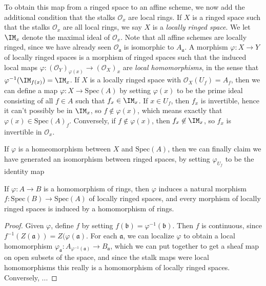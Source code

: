 To obtain this map from a ringed space to an affine scheme, we now add the additional condition that the stalks $\mathcal{O}_x$ are local rings. If $X$ is a ringed space such that the stalks $\mathcal{O}_x$ are all local rings, we say $X$ is a {\it locally ringed space}. We let $\IM_x$ denote the maximal ideal of $\mathcal{O}_x$. Note that all affine schemes are locally ringed, since we have already seen $\mathcal{O}_{\mathfrak{a}}$ is isomorphic to $A_{\mathfrak{a}}$. A morphism $\varphi: X \to Y$ of locally ringed spaces is a morphism of ringed spaces such that the induced local maps $\varphi: (\mathcal{O}_Y)_{\varphi(x)} \to (\mathcal{O}_X)_x$ are {\it local homomorphisms}, in the sense that $\varphi^{-1}(\IM_{f(x)}) = \IM_x$. If $X$ is a locally ringed space with $\mathcal{O}_X(U_f) = A_f$, then we can define a map $\varphi: X \to \text{Spec}(A)$ by setting $\varphi(x)$ to be the prime ideal consisting of all $f \in A$ such that $f_x \in \IM_x$. If $x \in U_f$, then $f_x$ is invertible, hence it can't possibly be in $\IM_x$, so $f \not \in \varphi(x)$, which means exactly that $\varphi(x) \in \text{Spec}(A)_f$. Conversely, if $f \not \in \varphi(x)$, then $f_x \not \in \IM_x$, so $f_x$ is invertible in $\mathcal{O}_x$.

If $\varphi$ is a homeomorphism between $X$ and $\text{Spec}(A)$, then we can finally claim we have generated an isomorphism between ringed spaces, by setting $\varphi_{U_f}$ to be the identity map

\begin{theorem}
    If $\varphi: A \to B$ is a homomorphism of rings, then $\varphi$ induces a natural morphism $f: \text{Spec}(B) \to \text{Spec}(A)$ of locally ringed spaces, and every morphism of locally ringed spaces is induced by a homomorphism of rings.
\end{theorem}
\begin{proof}
    Given $\varphi$, define $f$ by setting $f(\mathfrak{b}) = \varphi^{-1}(\mathfrak{b})$. Then $f$ is continuous, since $f^{-1}(Z(\mathfrak{a})) = Z(\varphi(\mathfrak{a})$. For each $\mathfrak{a}$, we can localize $\varphi$ to obtain a local homomorphism $\varphi_{\mathfrak{a}}: A_{\varphi^{-1}(\mathfrak{a})} \to B_{\mathfrak{a}}$, which we can put together to get a sheaf map on open subsets of the space, and since the stalk maps were local homomorphisms this really is a homomorphism of locally ringed spaces. Conversely, ...
\end{proof}






